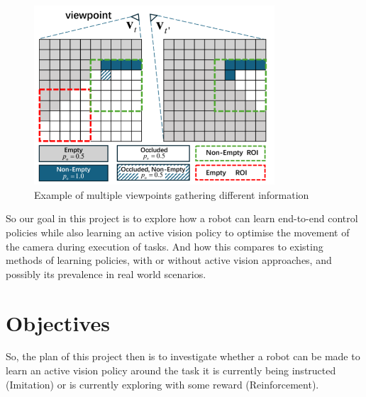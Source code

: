   \begin{figure}[h]
    \centering
    \includegraphics[width=0.8\textwidth]{assets/intro/grid-occluded.png}
    \caption{Example of multiple viewpoints gathering different information \cite{wang2024observeactasynchronousactive}}\label{fig:grid-occlusion}
  \end{figure}

  So our goal in this project is to explore how a robot can learn end-to-end control policies while also learning an active vision policy to optimise the movement of the camera during execution of tasks. And how this compares to existing methods of learning policies, with or without active vision approaches, and possibly its prevalence in real world scenarios. 

\section{Objectives}\label{sec:intro-objectives}
    So, the plan of this project then is to investigate whether a robot can be made to learn an active vision policy around the task it is currently being instructed (Imitation) or is currently exploring with some reward (Reinforcement).

